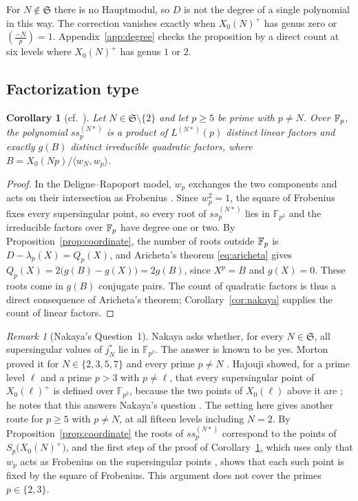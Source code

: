 \documentclass[11pt,a4paper]{article}
\newtheorem{corollary}[theorem]{Corollary}
\theoremstyle{remark}\newtheorem{remark}[theorem]{Remark}
\numberwithin{equation}{section}
\newcommand{\leg}[2]{\left(\frac{#1}{#2}\right)}
\begin{document}
	For $N\notin\mathfrak S$ there is no Hauptmodul, so $D$ is not the degree of a single polynomial in this way. The correction vanishes exactly when $X_0(N)^+$ has genus zero or $\leg{-N}{p}=1$. Appendix~\ref{app:degree} checks the proposition by a direct count at six levels where $X_0(N)^+$ has genus $1$ or $2$.
	
	\subsection{Factorization type}
	\begin{corollary}[cf.\ {\cite[Theorem 3.1]{Aricheta}}]\label{cor:factor}
		Let $N\in\mathfrak S\setminus\{2\}$ and let $p\geq5$ be prime with $p\neq N$. Over $\mathbb F_p$, the polynomial $ss_p^{(N*)}$ is a product of $L^{(N*)}(p)$ distinct linear factors and exactly $g(B)$ distinct irreducible quadratic factors, where $B=X_0(Np)/\langle w_N,w_p\rangle$.
	\end{corollary}
	\begin{proof}
		In the Deligne--Rapoport model, $w_p$ exchanges the two components and acts on their intersection as Frobenius \cite[Proposition 3.8(i)]{Ribet}. Since $w_p^2=1$, the square of Frobenius fixes every supersingular point, so every root of $ss_p^{(N*)}$ lies in $\mathbb F_{p^2}$ and the irreducible factors over $\mathbb F_p$ have degree one or two. By Proposition~\ref{prop:coordinate}, the number of roots outside $\mathbb F_p$ is $D-\lambda_p(X)=Q_p(X)$, and Aricheta's theorem \eqref{eq:aricheta} gives $Q_p(X)=2\bigl(g(B)-g(X)\bigr)=2g(B)$, since $X^p=B$ and $g(X)=0$. These roots come in $g(B)$ conjugate pairs. The count of quadratic factors is thus a direct consequence of Aricheta's theorem; Corollary~\ref{cor:nakaya} supplies the count of linear factors.
	\end{proof}
	
	\begin{remark}[Nakaya's Question~1]
		Nakaya asks \cite[Section~4, Question~1]{Nakaya} whether, for every $N \in \mathfrak S$,
		all supersingular values of $j_N^*$ lie in $\mathbb{F}_{p^2}$. The answer is
		known to be yes. Morton proved it for $N \in \{2,3,5,7\}$ and every prime
		$p \ne N$ \cite[Theorem~6.1]{Morton5a}. Hajouji showed, for a prime level
		$\ell$ and a prime $p>3$ with $p \ne \ell$, that every supersingular point of
		$X_0(\ell)^+$ is defined over $\mathbb{F}_{p^2}$, because the two points of
		$X_0(\ell)$ above it are \cite[Proposition~2.9(1)]{Hajouji}; he notes that this answers Nakaya's question \cite[Section~2.5]{Hajouji}. The setting here
		gives another route for $p \ge 5$ with $p \ne N$, at all fifteen levels
		including $N = 2$. By Proposition~\ref{prop:coordinate} the roots of $ss_p^{(N*)}$ correspond to the points
		of $S_p\bigl(X_0(N)^+\bigr)$, and the first step of the proof of
		Corollary~\ref{cor:factor}, which uses only that $w_p$ acts as Frobenius on the supersingular
		points \cite[Proposition~3.8(i)]{Ribet}, shows that each such point is fixed by
		the square of Frobenius. This argument does not cover the primes $p \in \{2,3\}$.
	\end{remark}
	
\end{document}
